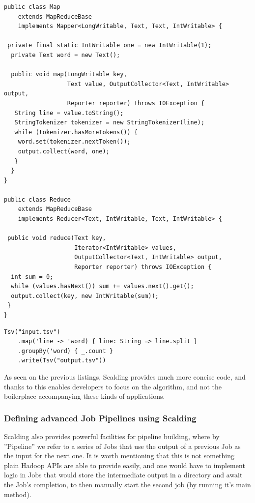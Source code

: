 \begin{lstlisting}[caption={Word Count example Job, implemented using plain Java Map Reduce API}, label={lst:hadoop-mr}]
public class Map 
    extends MapReduceBase 
    implements Mapper<LongWritable, Text, Text, IntWritable> {

 private final static IntWritable one = new IntWritable(1);
  private Text word = new Text();

  public void map(LongWritable key, 
                  Text value, OutputCollector<Text, IntWritable> output, 
                  Reporter reporter) throws IOException {
   String line = value.toString();
   StringTokenizer tokenizer = new StringTokenizer(line);
   while (tokenizer.hasMoreTokens()) {
    word.set(tokenizer.nextToken());
    output.collect(word, one);
   }
  }
}

public class Reduce 
    extends MapReduceBase 
    implements Reducer<Text, IntWritable, Text, IntWritable> {

 public void reduce(Text key, 
                    Iterator<IntWritable> values, 
                    OutputCollector<Text, IntWritable> output, 
                    Reporter reporter) throws IOException {
  int sum = 0;
  while (values.hasNext()) sum += values.next().get();
  output.collect(key, new IntWritable(sum));
 }
}
\end{lstlisting}


\begin{lstlisting}[caption={Simplest Scalding job used in Oculus -- each frame perceptual hashing}, label={lst:simplest-scalding-job}]
  Tsv("input.tsv")
    .map('line -> 'word) { line: String => line.split }
    .groupBy('word) { _.count }
    .write(Tsv("output.tsv"))
\end{lstlisting}

As seen on the previous listings, Scalding provides much more concise code, and thanks to this enables developers to focus on the algorithm, and not the boilerplace accompanying these kinds of applications.

\subsubsection{Defining advanced Job Pipelines using Scalding}
\label{sec:defining-pipelines-basics}
Scalding also provides powerful facilities for pipeline building, where by ''Pipeline'' we refer to a series of Jobs that use the output of a previous Job as the input for the next one. It is worth mentioning that this is not something plain Hadoop APIs are able to provide easily, and one would have to implement logic in Jobs that would store the intermediate output in a directory and await the Job's completion, to then manually start the second job (by running it's main method).

